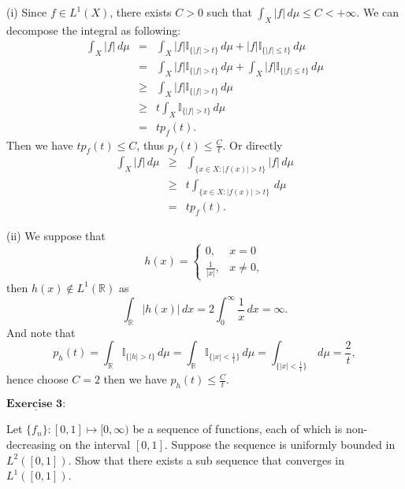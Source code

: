 \documentclass[12pt,a4paper]{ctexart}
\begin{document}
(i) Since $f \in L^{1}(X)$, there exists $C > 0$ such that $\int_{X}^{} |f| \, d \mu \leq C < + \infty$. We can decompose the integral as following:
\begin{eqnarray*}
\int_{X}^{} |f| \, d \mu &=& \int_{X}^{} |f| \mathbb{I}_{\{|f| > t\}} \, d \mu + |f| \mathbb{I}_{\{|f| \leq t\}} \, d \mu  \\
            &=& \int_{X}^{} |f| \mathbb{I}_{\{|f| > t\}} \, d \mu + \int_{X}^{} |f| \mathbb{I}_{\{|f| \leq t\}} \, d \mu  \\
            &\geq & \int_{X}^{} |f| \mathbb{I}_{\{|f| > t\}} \, d \mu  \\
            & \geq & t \int_{X}^{} \mathbb{I}_{\{|f| > t\}} \, d \mu \\
            & = & t p_{f}(t).
\end{eqnarray*}
Then we have $t p_{f}(t) \leq C$, thus $p_{f}(t) \leq \frac{C}{t}$. Or directly
\begin{eqnarray*}
\int_{X}^{} |f| \, d \mu & \geq & \int_{\{x \in X: |f(x)| > t \}} |f| \, d \mu  \\
            & \geq & t \int_{\{x \in X: |f(x)| > t \}} \, d \mu  \\
            & = & t p_f(t).
\end{eqnarray*}

(ii) We suppose that 
\begin{equation*}
h(x) =
\left\{
             \begin{array}{cl}
             0, & x = 0 \\
             \frac{1}{|x|}, & x \neq 0,
             \end{array}
\right.
\end{equation*}
then $h(x) \notin L^{1}(\mathbb{R})$ as
$$\int_{\mathbb R} |h(x)| \, d x = 2 \int_{0}^{\infty} \frac{1}{x} \, d x = \infty.$$
And note that
\begin{equation*}
p_{h}(t) = \int_{\mathbb{R}}^{} \mathbb{I}_{\{|h| > t\}} \, d \mu  = \int_{\mathbb{R}}^{} \mathbb{I}_{\{|x| < \frac{1}{t} \}} \, d \mu  =  \int_{\{|x| < \frac{1}{t} \}}^{} \, d \mu = \frac{2}{t},
\end{equation*}
hence choose $C = 2$ then we have $p_{h} (t) \leq \frac{C}{t}$.

\newpage

$\underline{\textbf{Exercise 3:}}$

Let $\{f_{n}\} : [0, 1] \mapsto [0, \infty) $ be a sequence of functions, each of which is non-decreasing on the interval $[0, 1]$. Suppose the sequence is uniformly bounded in $L^{2}([0, 1])$. Show that there exists a sub sequence that converges in $L^{1}([0, 1])$.
\end{document}
